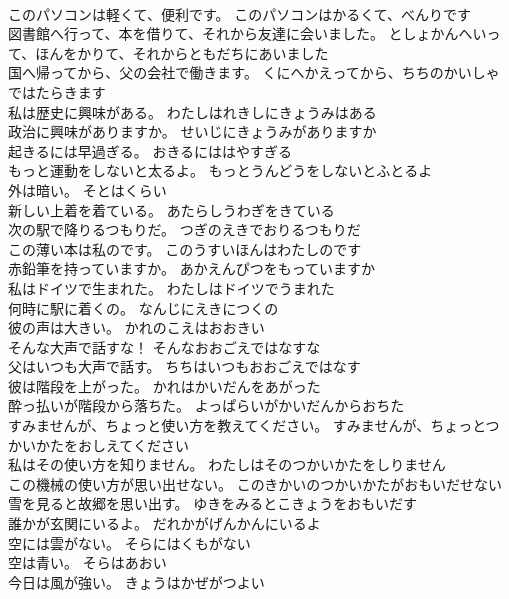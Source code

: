 \documentclass[8pt]{extreport}
\begin{document}
\begin{CJK}{UTF8}{min}
\\	このパソコンは軽くて、便利です。	このパソコンはかるくて、べんりです 
\\	図書館へ行って、本を借りて、それから友達に会いました。	としょかんへいって、ほんをかりて、それからともだちにあいました 
\\	国へ帰ってから、父の会社で働きます。	くにへかえってから、ちちのかいしゃではたらきます 
\\	私は歴史に興味がある。	わたしはれきしにきょうみはある 
\\	政治に興味がありますか。	せいじにきょうみがありますか 
\\	起きるには早過ぎる。	おきるにははやすぎる 
\\	もっと運動をしないと太るよ。	もっとうんどうをしないとふとるよ 
\\	外は暗い。	そとはくらい 
\\	新しい上着を着ている。	あたらしうわぎをきている 
\\	次の駅で降りるつもりだ。	つぎのえきでおりるつもりだ 
\\	この薄い本は私のです。	このうすいほんはわたしのです 
\\	赤鉛筆を持っていますか。	あかえんぴつをもっていますか 
\\	私はドイツで生まれた。	わたしはドイツでうまれた 
\\	何時に駅に着くの。	なんじにえきにつくの 
\\	彼の声は大きい。	かれのこえはおおきい 
\\	そんな大声で話すな！	そんなおおごえではなすな 
\\	父はいつも大声で話す。	ちちはいつもおおごえではなす 
\\	彼は階段を上がった。	かれはかいだんをあがった 
\\	酔っ払いが階段から落ちた。	よっぱらいがかいだんからおちた 
\\	すみませんが、ちょっと使い方を教えてください。	すみませんが、ちょっとつかいかたをおしえてください 
\\	私はその使い方を知りません。	わたしはそのつかいかたをしりません 
\\	この機械の使い方が思い出せない。	このきかいのつかいかたがおもいだせない 
\\	雪を見ると故郷を思い出す。	ゆきをみるとこきょうをおもいだす 
\\	誰かが玄関にいるよ。	だれかがげんかんにいるよ 
\\	空には雲がない。	そらにはくもがない 
\\	空は青い。	そらはあおい 
\\	今日は風が強い。	きょうはかぜがつよい 

\end{CJK}
\end{document}
